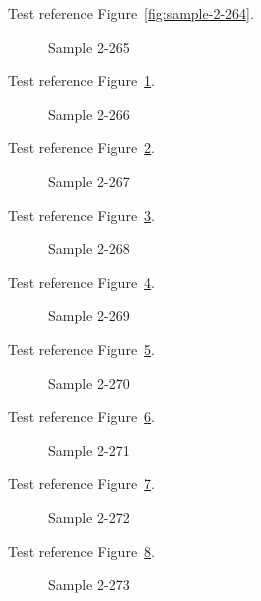 Test reference Figure~\ref{fig:sample-2-264}.

\begin{figure}[tbhp]
\caption{Sample 2-265}
\label{fig:sample-2-265}
\end{figure}

Test reference Figure~\ref{fig:sample-2-265}.

\begin{figure}[tbhp]
\caption{Sample 2-266}
\label{fig:sample-2-266}
\end{figure}

Test reference Figure~\ref{fig:sample-2-266}.

\begin{figure}[tbhp]
\caption{Sample 2-267}
\label{fig:sample-2-267}
\end{figure}

Test reference Figure~\ref{fig:sample-2-267}.

\begin{figure}[tbhp]
\caption{Sample 2-268}
\label{fig:sample-2-268}
\end{figure}

Test reference Figure~\ref{fig:sample-2-268}.

\begin{figure}[tbhp]
\caption{Sample 2-269}
\label{fig:sample-2-269}
\end{figure}

Test reference Figure~\ref{fig:sample-2-269}.

\begin{figure}[tbhp]
\caption{Sample 2-270}
\label{fig:sample-2-270}
\end{figure}

Test reference Figure~\ref{fig:sample-2-270}.

\begin{figure}[tbhp]
\caption{Sample 2-271}
\label{fig:sample-2-271}
\end{figure}

Test reference Figure~\ref{fig:sample-2-271}.

\begin{figure}[tbhp]
\caption{Sample 2-272}
\label{fig:sample-2-272}
\end{figure}

Test reference Figure~\ref{fig:sample-2-272}.

\begin{figure}[tbhp]
\caption{Sample 2-273}
\label{fig:sample-2-273}
\end{figure}

